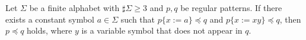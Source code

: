 \begin{lem}\label{補題15}
Let $\Sigma$ be a finite alphabet with $\sharp \Sigma \ge 3$ and $p,q$ be regular patterns.
If there exists a constant symbol $a \in \Sigma$ such that $p \{ x := a \} \preceq q$ and $p \{ x := xy \} \preceq q$, then $p \preceq q$ holds, where $y$ is a variable symbol that does not appear in $q$.
\end{lem}


%
